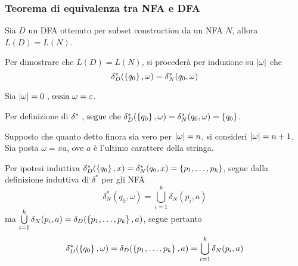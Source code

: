 \documentclass{subfiles}
\begin{document}
\subsubsection{Teorema di equivalenza tra NFA e DFA}
\begin{Theorem}
    Sia \(D\) un DFA ottenuto per subset construction da un NFA \(N\), allora \(L(D) = L(N)\).
    \begin{Proof*}
        Per dimostrare che \(L(D) = L(N)\), si procederà per induzione su \(\abs{\omega}\) che
        \begin{equation}
            \delta_{D}^{*}(\left\{q_{0}\right\}, \omega) = \delta_{N}^{*}(q_{0}, \omega)
        \end{equation}

        \begin{Base*}
            Sia \(\abs{\omega} = 0\text{, ossia} \omega = \varepsilon\).

            \noindent Per definizione di \(\delta^{*} \text{, segue che} \delta_{D}^{*}(\Set{q_{0}}, \omega) = \delta_{N}^{*}(q_{0}, \omega) = \Set{q_{0}}\).
        \end{Base*}
        \begin{Induction*}
            Supposto che quanto detto finora sia vero per \(\abs{\omega} = n\), si consideri \(\abs{\omega} = n + 1\).
            Sia posta \(\omega = xa\), ove \(a\) è l'ultimo carattere della stringa.

            \noindent Per ipotesi induttiva \(\delta_{D}^{*}(\left\{q_{0}\right\}, x) = \delta_{N}^{*}(q_{0}, x) = \left\{p_{1}, \ldots, p_{k}\right\}\),
            segue dalla definizione induttiva di \(\delta^{*}\) per gli NFA
            \begin{equation*}
                \delta_{N}^{*}(q_{0}, \omega) = \bigcup\limits_{i = 1}^{k}{\delta_{N}(p_{i}, a)}
            \end{equation*}
            ma \(\bigcup\limits_{i = 1}^{k}{\delta_{N}(p_{i}, a)} = \delta_{D}(\left\{p_{1}, \ldots, p_{k}\right\}, a)\), segue pertanto
            \begin{equation*}
                \delta_{D}^{*}(\left\{q_{0}\right\}, \omega) = \delta_{D}(\left\{p_{1}, \ldots, p_{k}\right\}, a) = \bigcup\limits_{i = 1}^{k}{\delta_{N}(p_{i}, a)}
            \end{equation*}
        \end{Induction*}
    \end{Proof*}
\end{Theorem}
\clearpage
\end{document}
